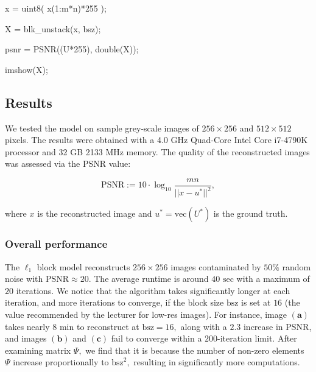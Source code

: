 \documentclass[]{article}
\newenvironment{Shaded}{}{}
\newcommand{\CommentTok}[1]{\textcolor[rgb]{0.38,0.63,0.69}{\textit{#1}}}
\newcommand{\FloatTok}[1]{\textcolor[rgb]{0.25,0.63,0.44}{#1}}
\newcommand{\NormalTok}[1]{#1}
\begin{document}
\begin{Shaded}
\begin{Highlighting}[]
\CommentTok{% scale and transform the stacked image back into matrix
}
\NormalTok{x = uint8( x(}\FloatTok{1}\NormalTok{:m*n)*}\FloatTok{255}\NormalTok{ );
}
\NormalTok{X = blk_unstack(x, bsz);
}


\CommentTok{% evaluate PSNR
}
\NormalTok{psnr = PSNR((U*}\FloatTok{255}\NormalTok{), double(X));
}
\NormalTok{imshow(X);}
\end{Highlighting}
\end{Shaded}

\hypertarget{header-n23}{%
\subsection{Results}\label{header-n23}}

We tested the model on sample grey-scale images of \(256\times256\) and
\(512\times512\) pixels. The results were obtained with a 4.0 GHz
Quad-Core Intel Core i7-4790K processor and 32 GB 2133 MHz memory. The
quality of the reconstructed images was assessed via the PSNR value:

\[\text{PSNR}:=10\cdot\log_{10}\frac{mn}{||x-u^*||^2},\]

where \(x\) is the reconstructed image and \(u^*=\text{vec}(U^*)\) is
the ground truth.

\hypertarget{header-n28}{%
\subsubsection{Overall performance}\label{header-n28}}

The \(\ell_1\) block model reconstructs \(256\times256\) images
contaminated by \(50\%\) random noise with \(\text{PSNR}\approx 20.\)
The average runtime is around \(40\text{ sec}\) with a maximum of \(20\)
iterations. We notice that the algorithm takes significantly longer at
each iteration, and more iterations to converge, if the block size
\(\text{bsz}\) is set at \(16\) (the value recommended by the lecturer
for low-res images). For instance, image \((\mathbf a)\) takes nearly
\(8\text{ min}\) to reconstruct at \(\text{bsz}=16,\) along with a
\(2.3\) increase in PSNR, and images \((\mathbf b)\) and \((\mathbf c)\)
fail to converge within a \(200\)-iteration limit. After examining
matrix \(\Psi,\) we find that it is because the number of non-zero
elements \(\Psi\) increase proportionally to \(\text{bsz}^2,\) resulting
in significantly more computations.
\end{document}
